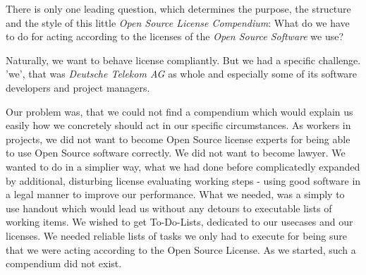 %
%
%
%
%



There is only one leading question, which determines the purpose, the structure
and the style of this little \emph{Open Source License Compendium}: What do we
have to do for acting according to the licenses of the \emph{Open Source
Software} we use? 

Naturally, we want to behave license compliantly. But we had a specific
challenge. 'we', that was \emph{Deutsche Telekom AG} as whole and especially
some of its software developers and project managers.

Our problem was, that we could not find a compendium which would explain us
easily how we concretely should act in our specific circumstances. As workers in
projects, we did not want to become Open Source license experts for being able
to use Open Source software correctly. We did not want to become lawyer. We
wanted to do in a simplier way, what we had done before complicatedly expanded
by additional, disturbing license evaluating working steps - using good software
in a legal manner to improve our performance. What we needed, was a simply to
use handout which would lead us without any detours to executable lists of
working items. We wished to get To-Do-Lists, dedicated to our usecases and our
licenses. We needed reliable lists of tasks we only had to execute for being
sure that we were acting according to the Open Source License. As we started,
such a compendium did not exist.


